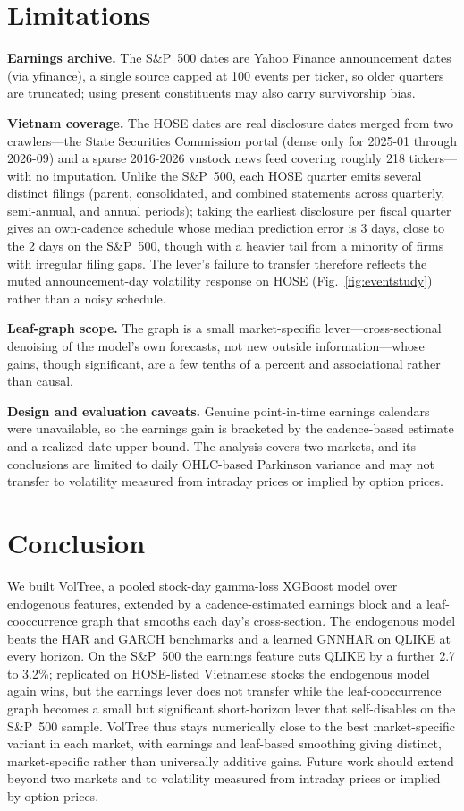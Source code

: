 \documentclass[runningheads,a4paper]{llncs}
\begin{document}
\FloatBarrier
\section{Limitations}
\noindent\textbf{Earnings archive.} The S\&P~500 dates are Yahoo Finance announcement dates (via
yfinance), a single source capped at 100 events per ticker, so older quarters are truncated; using present
constituents may also carry survivorship bias.

\noindent\textbf{Vietnam coverage.} The HOSE dates are real disclosure dates merged from two crawlers---the
State Securities Commission portal (dense only for 2025-01 through 2026-09) and a sparse 2016-2026 vnstock
news feed covering roughly 218 tickers---with no imputation. Unlike the S\&P~500, each HOSE quarter emits
several distinct filings (parent, consolidated, and combined statements across quarterly, semi-annual, and
annual periods); taking the earliest disclosure per fiscal quarter gives an own-cadence schedule whose
median prediction error is 3 days, close to the 2 days on the S\&P~500, though with a heavier tail from a
minority of firms with irregular filing gaps. The lever's failure to transfer therefore reflects the muted
announcement-day volatility response on HOSE (Fig.~\ref{fig:eventstudy}) rather than a noisy schedule.

\noindent\textbf{Leaf-graph scope.} The graph is a small market-specific lever---cross-sectional denoising
of the model's own forecasts, not new outside information---whose gains, though significant, are a few
tenths of a percent and associational rather than causal.

\noindent\textbf{Design and evaluation caveats.} Genuine point-in-time
earnings calendars were unavailable, so the earnings gain is bracketed by the cadence-based estimate and a
realized-date upper bound. The analysis covers two markets, and its conclusions are limited to daily
OHLC-based Parkinson variance and may not transfer to volatility measured from intraday prices or implied by option prices.

\section{Conclusion}
We built VolTree, a pooled stock-day gamma-loss XGBoost model over endogenous features, extended by a
cadence-estimated earnings block and a leaf-cooccurrence graph that smooths each day's cross-section. The
endogenous model beats the HAR and GARCH benchmarks and a learned GNNHAR on QLIKE at every horizon. On the
S\&P~500 the earnings feature cuts QLIKE by a further
2.7 to 3.2\%; replicated on HOSE-listed Vietnamese stocks the endogenous model again wins, but the earnings lever
does not transfer while the leaf-cooccurrence graph becomes a small but significant short-horizon lever that
self-disables on the S\&P~500 sample. VolTree thus stays numerically close to the best
market-specific variant in each market, with earnings and leaf-based smoothing giving distinct,
market-specific rather than universally additive gains. Future work should extend beyond two markets and to
volatility measured from intraday prices or implied by option prices.
\end{document}
